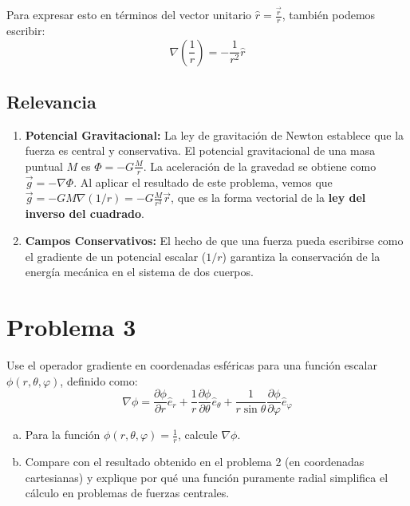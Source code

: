 \documentclass[12pt, letterpaper]{article}
\begin{document}
Para expresar esto en términos del vector unitario $\hat{r} = \frac{\vec{r}}{r}$, también podemos escribir:
$$ \nabla \left( \frac{1}{r} \right) = -\frac{1}{r^2} \hat{r} $$

\subsection{Relevancia}

\begin{enumerate}
    \item \textbf{Potencial Gravitacional:} La ley de gravitación de Newton establece que la fuerza es central y conservativa. El potencial gravitacional de una masa puntual $M$ es $\Phi = -G \frac{M}{r}$. La aceleración de la gravedad se obtiene como $\vec{g} = -\nabla \Phi$. Al aplicar el resultado de este problema, vemos que $\vec{g} = -GM \nabla(1/r) = -G \frac{M}{r^3} \vec{r}$, que es la forma vectorial de la \textbf{ley del inverso del cuadrado}.

    \item \textbf{Campos Conservativos:} El hecho de que una fuerza pueda escribirse como el gradiente de un potencial escalar ($1/r$) garantiza la conservación de la energía mecánica en el sistema de dos cuerpos.
\end{enumerate}



\section{Problema 3}

Use el operador gradiente en coordenadas esféricas para una función escalar $\phi(r, \theta, \varphi)$, definido como:
$$ \nabla \phi = \frac{\partial \phi}{\partial r} \hat{e}_r + \frac{1}{r} \frac{\partial \phi}{\partial \theta} \hat{e}_\theta + \frac{1}{r \sin \theta} \frac{\partial \phi}{\partial \varphi} \hat{e}_\varphi $$

\begin{enumerate}[a)]
    \item Para la función $\phi(r, \theta, \varphi) = \frac{1}{r}$, calcule $\nabla \phi$.
    \item Compare con el resultado obtenido en el problema 2 (en coordenadas cartesianas) y explique por qué una función puramente radial simplifica el cálculo en problemas de fuerzas centrales.
\end{enumerate}
\end{document}
